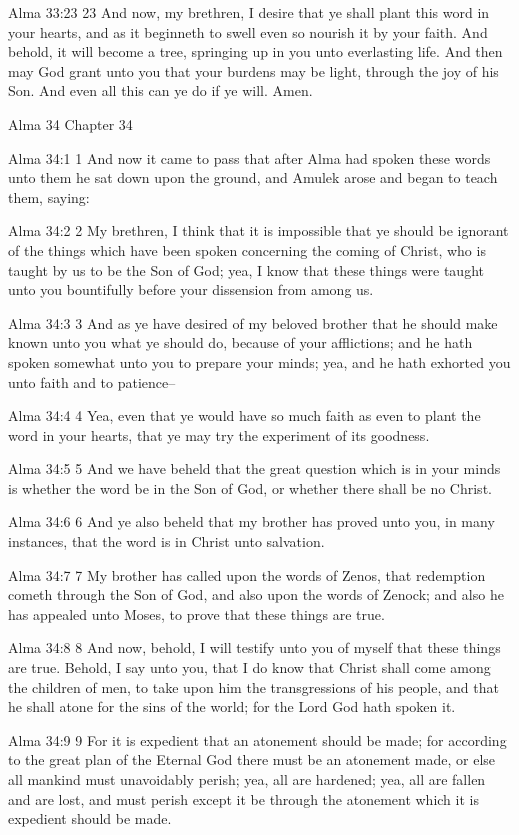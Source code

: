 Alma 33:23
 23 And now, my brethren, I desire that ye shall plant this word
in your hearts, and as it beginneth to swell even so nourish it
by your faith. And behold, it will become a tree, springing up
in you unto everlasting life. And then may God grant unto you
that your burdens may be light, through the joy of his Son. And
even all this can ye do if ye will. Amen.

Alma 34
Chapter 34

Alma 34:1
 1 And now it came to pass that after Alma had spoken these words
unto them he sat down upon the ground, and Amulek arose and began
to teach them, saying:

Alma 34:2
 2 My brethren, I think that it is impossible that ye should be
ignorant of the things which have been spoken concerning the
coming of Christ, who is taught by us to be the Son of God; yea,
I know that these things were taught unto you bountifully before
your dissension from among us.

Alma 34:3
 3 And as ye have desired of my beloved brother that he should
make known unto you what ye should do, because of your
afflictions; and he hath spoken somewhat unto you to prepare your
minds; yea, and he hath exhorted you unto faith and to patience--

Alma 34:4
 4 Yea, even that ye would have so much faith as even to plant
the word in your hearts, that ye may try the experiment of its
goodness.

Alma 34:5
 5 And we have beheld that the great question which is in your
minds is whether the word be in the Son of God, or whether there
shall be no Christ.

Alma 34:6
 6 And ye also beheld that my brother has proved unto you, in
many instances, that the word is in Christ unto salvation.

Alma 34:7
 7 My brother has called upon the words of Zenos, that redemption
cometh through the Son of God, and also upon the words of Zenock;
and also he has appealed unto Moses, to prove that these things
are true.

Alma 34:8
 8 And now, behold, I will testify unto you of myself that these
things are true. Behold, I say unto you, that I do know that
Christ shall come among the children of men, to take upon him the
transgressions of his people, and that he shall atone for the
sins of the world; for the Lord God hath spoken it.

Alma 34:9
 9 For it is expedient that an atonement should be made; for
according to the great plan of the Eternal God there must be an
atonement made, or else all mankind must unavoidably perish; yea,
all are hardened; yea, all are fallen and are lost, and must
perish except it be through the atonement which it is expedient
should be made.

